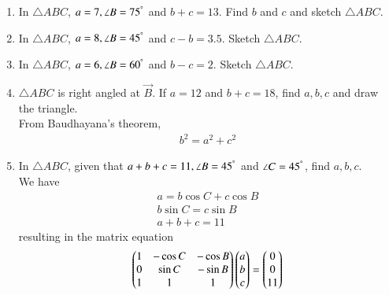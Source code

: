 \documentclass[journal,12pt,twocolumn]{IEEEtran}
\renewcommand\thesection{\arabic{section}}
\begin{document}
\begin{enumerate}[label=\thesection.\arabic*
,ref=\thesection.\theenumi]
%
\item In $\triangle ABC$,  $a = 7, \angle B = 75^{\degree}$ and $b+c = 13$. 
Find $b$ and $c$ and sketch $\triangle ABC$.
\item In $\triangle ABC$,  $a = 8, \angle B = 45^{\degree}$ and $c-b = 3.5$.
Sketch $\triangle ABC$.
\item In $\triangle ABC$,  $a = 6, \angle B = 60^{\degree}$ and $b-c = 2$. 
Sketch $\triangle ABC$.
\item $\triangle ABC$ is right angled at $\vec{B}$.  If $a = 12$ and $b+c = 18$, find $a,b,c$ and draw the 
triangle.
\\
\solution From Baudhayana's theorem, 
\begin{align}
b^2 = a^2 + c^2
\end{align}
%
\item In $\triangle ABC$,  given that $a+b+c = 11, \angle B = 45^{\degree}$ and $\angle C = 45^{\degree}$, 
find 
$a,b,c$.
\\
\solution We have
\begin{align}
a = b \cos C + c \cos B
\\
b \sin C = c \sin B
\\
a + b+c = 11
\end{align}
%
resulting  in the matrix equation 
\begin{align}
\begin{pmatrix}
1 & -\cos C & - \cos B
\\
0 & \sin C &- \sin B
\\
1 & 1 & 1
\end{pmatrix}
\begin{pmatrix}a \\b\\c\end{pmatrix} = \begin{pmatrix}0 \\ 0 \\ 11\end{pmatrix}
\end{align}


\end{enumerate}
\end{document}

